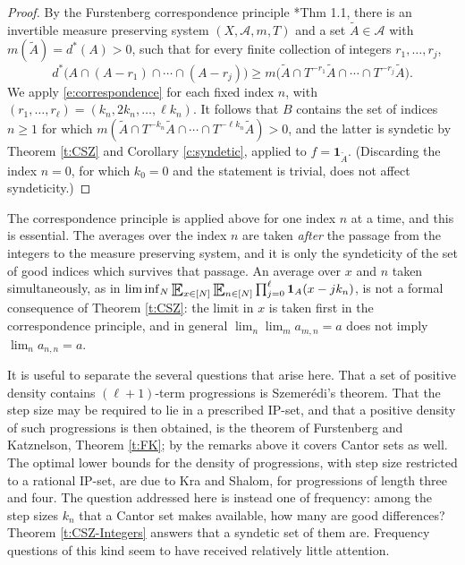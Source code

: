 \begin{proof}
By the Furstenberg correspondence principle \cite{MR0498471}*{Thm 1.1}, there is an invertible measure preserving system 
$(X,\mathcal A, m ,T)$ and a set $\tilde A \in \mathcal A$ with $m (\tilde A) = d ^{\ast}(A)>0$, such that for every finite collection of integers $r_1 , \ldots, r_j$, 
\begin{equation} \label{e:correspondence}
d ^{\ast} \bigl( A \cap (A - r_1) \cap \cdots \cap (A-r_j) \bigr) 
\geq 
m \bigl( \tilde A \cap T ^{-r_1} \tilde A \cap \cdots \cap T ^{-r_j} \tilde A \bigr) . 
\end{equation}
We apply \eqref{e:correspondence}  for each fixed index $n$, with $(r_1 , \ldots, r_ \ell ) = (k_n , 2k_n , \ldots, \ell k_n)$.  
It follows that $B$ contains the set of indices $n \geq 1$ for which 
$m ( \tilde A \cap T ^{-k_n} \tilde A \cap \cdots \cap T ^{- \ell k_n} \tilde A )>0$, and the latter is syndetic by 
Theorem \ref{t:CSZ} and Corollary \ref{c:syndetic}, applied to $f = \mathbf 1_{\tilde A}$.  
(Discarding the index $n=0$, for which $k_0=0$ and the statement is trivial, does not affect syndeticity.)  
\end{proof}

\begin{remark}  \label{r:order}
    The correspondence principle is applied above for one index $n$ at a time, and this is essential.  
    The averages over the index $n$ are taken \emph{after} the passage from the integers to the measure preserving system, 
    and it is only the syndeticity of the set of good indices which survives that passage.  
    An average over $x$ and $n$ taken simultaneously, as in 
    $\liminf_{N} \Expectation_{x \in [N]} \Expectation_{n \in [N]} \prod_{j=0}^{\ell}\mathbf 1_{A} (x - jk_n)$, 
    is not a formal consequence of Theorem \ref{t:CSZ}: 
    the limit in $x$ is taken first in the correspondence principle, and in general 
    $\lim_{n} \lim _{m} a_{m,n} = a$ does not imply $\lim_n a_{n,n}=a$.  
\end{remark}

\begin{remark} \label{r:novelty}
    It is useful to separate the several questions that arise here.  
    That a set of positive density contains $(\ell+1)$-term progressions is Szemer\'edi's theorem.  
    That the step size may be required to lie in a prescribed IP-set, and that a positive density of such progressions is then obtained, 
    is the theorem of Furstenberg and Katznelson, Theorem \ref{t:FK}; by the remarks above it covers Cantor sets as well.  
    The optimal lower bounds for the density of progressions, with step size restricted to a rational IP-set, are due to Kra and Shalom, 
    for progressions of length three and four.  
    The question addressed here is instead one of frequency: among the step sizes $k_n$ that a Cantor set makes available, 
    how many are good differences?  Theorem \ref{t:CSZ-Integers} answers that a syndetic set of them are.  
    Frequency questions of this kind seem to have received relatively little attention.  
\end{remark}


